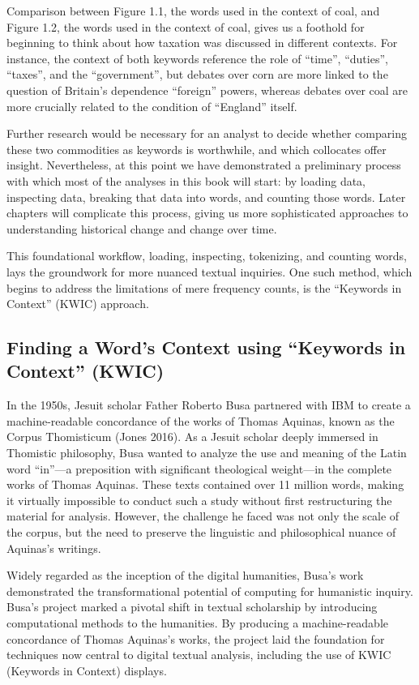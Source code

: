 \documentclass[
]{article}
\newcounter{chapter}
\begin{document}
Comparison between Figure 1.1, the words used in the context of coal,
and Figure 1.2, the words used in the context of coal, gives us a
foothold for beginning to think about how taxation was discussed in
different contexts. For instance, the context of both keywords reference
the role of ``time'', ``duties'', ``taxes'', and the ``government'', but
debates over corn are more linked to the question of Britain's
dependence ``foreign'' powers, whereas debates over coal are more
crucially related to the condition of ``England'' itself.

Further research would be necessary for an analyst to decide whether
comparing these two commodities as keywords is worthwhile, and which
collocates offer insight. Nevertheless, at this point we have
demonstrated a preliminary process with which most of the analyses in
this book will start: by loading data, inspecting data, breaking that
data into words, and counting those words. Later chapters will
complicate this process, giving us more sophisticated approaches to
understanding historical change and change over time.

This foundational workflow, loading, inspecting, tokenizing, and
counting words, lays the groundwork for more nuanced textual inquiries.
One such method, which begins to address the limitations of mere
frequency counts, is the ``Keywords in Context'' (KWIC) approach.

\subsection{Finding a Word's Context using ``Keywords in Context''
(KWIC)}\label{finding-a-words-context-using-keywords-in-context-kwic}

In the 1950s, Jesuit scholar Father Roberto Busa partnered with IBM to
create a machine-readable concordance of the works of Thomas Aquinas,
known as the Corpus Thomisticum (Jones 2016). As a Jesuit scholar deeply
immersed in Thomistic philosophy, Busa wanted to analyze the use and
meaning of the Latin word ``in''---a preposition with significant
theological weight---in the complete works of Thomas Aquinas. These
texts contained over 11 million words, making it virtually impossible to
conduct such a study without first restructuring the material for
analysis. However, the challenge he faced was not only the scale of the
corpus, but the need to preserve the linguistic and philosophical nuance
of Aquinas's writings.

Widely regarded as the inception of the digital humanities, Busa's work
demonstrated the transformational potential of computing for humanistic
inquiry. Busa's project marked a pivotal shift in textual scholarship by
introducing computational methods to the humanities. By producing a
machine-readable concordance of Thomas Aquinas's works, the project laid
the foundation for techniques now central to digital textual analysis,
including the use of KWIC (Keywords in Context) displays.
\end{document}
